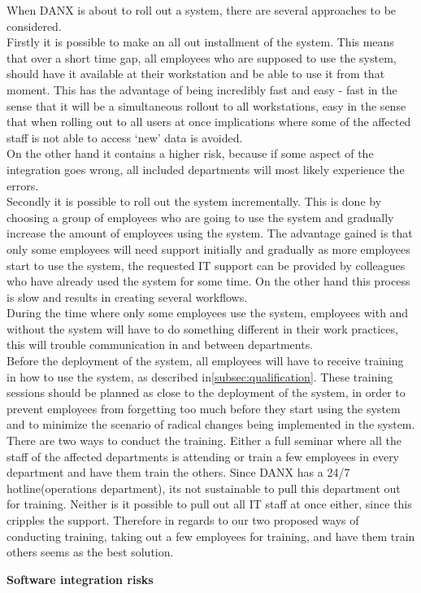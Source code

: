 When DANX is about to roll out a system, there are several approaches to be considered.\\
Firstly it is possible to make an all out installment of the system. This means that over a short time gap, all employees who are supposed to use the system, should have it available at their workstation and be able to use it from that moment.
This has the advantage of being incredibly fast and easy - fast in the sense that it will be a simultaneous rollout to all workstations, easy in the sense that when rolling out to all users at once implications where some of the affected staff is not able to access ‘new’ data is avoided.\\
On the other hand it contains a higher risk, because if some aspect of the integration goes wrong, all included departments will most likely experience the errors.\\
Secondly it is possible to roll out the system incrementally. This is done by choosing a group of employees who are going to use the system and gradually increase the amount of employees using the system.
The advantage gained is that only some employees will need support initially and gradually as more employees start to use the system, the requested IT support can be  provided by  colleagues who have already used the system for some time.
On the other hand this process is slow and results in creating several workflows.\\
During the time where only some employees use the system, employees with and without the system will have to do something different in their work practices, this will trouble communication in and between departments.\\
Before the deployment of the system, all employees will have to receive training in how to use the system, as described in\ref{subsec:qualification}. These training sessions should be planned as close to the deployment of the system, in order to prevent employees from forgetting too much before they start using the system and to minimize the scenario of radical changes being implemented in the system.\\
There are two ways to conduct the training. Either a full seminar where all the staff of the affected departments is attending or train a few employees in every department and have them train the others.
Since DANX has a 24/7 hotline(operations department), its not sustainable to pull this department out for training. Neither is it possible to pull out all IT staff at once either, since this cripples the support.
Therefore in regards to our two proposed ways of conducting training, taking out a few employees for training, and have them train others seems as the best solution.

\textbf{Software integration risks}